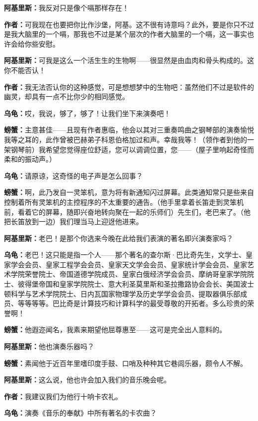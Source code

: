 \documentclass[
  12pt,
  twoside,
  openright,
  oldfontcommands,
]{memoir}
\newcommand{\kaitismall}[1]{{\kaitifamily\small #1}}
\newcommand{\dialogname}[1]{{\sffamily\bfseries #1}}
\begin{document}
\dialogname{阿基里斯：}我反对只是像个嗝那样存在！

\dialogname{作者：}可我现在也要把你比作沙堡，阿基。这不很有诗意吗？此外，要是你只不过是我大脑里的一个嗝，那我也不过是某个层次的作者大脑里的一个嗝，这一事实也许会给你些安慰。

\dialogname{阿基里斯：}可我是这么一个活生生的生物啊------很显然是由血肉和骨头构成的。这你不能否认！

\dialogname{作者：}我无法否认你的这种感觉，可是想想梦中的生物吧：虽然他们不过是软件的幽灵，却具有一点不比你少的相同感觉。

\dialogname{乌龟：}哎，我说，够了，够了！让我们坐下来演奏吧！

\dialogname{螃蟹：}主意甚佳------且现有作者惠临，他会以其对三重奏鸣曲之钢琴部的演奏愉悦我等之耳的，此作曾被巴赫弟子科恩伯格加过和声。幸哉我等！\kaitismall{（领作者到他的一架钢琴前）}我希望您觉得座位舒适，您可以调调位置，您------\kaitismall{（屋子里响起奇怪而柔和的振动声。）}

\dialogname{乌龟：}请原谅，这奇怪的电子声是怎么回事？

\dialogname{螃蟹：}啊，此乃发自一灵笨机，意为将有新通知闪过屏幕。此类通知常只是些来自控制着所有灵笨机的主控程序的不太重要的通告。\kaitismall{（他手里拿着长笛走到灵笨机前，看着它的屏幕，随即兴奋地转向聚在一起的乐师们）}先生们，老巴来了。\kaitismall{（他把长笛放到一边）}我们理当马上迎迓他进来。

\dialogname{阿基里斯：}老巴！是那个你选来今晚在此给我们表演的著名即兴演奏家吗？

\dialogname{乌龟：}老巴！这只能是指一个人------那个著名的查尔斯·巴比奇先生，文学士、皇家学会会员、皇家工程学会会员、皇家天文学会会员、皇家统计学会会员、皇家艺术学院荣誉院士、帝国道德学院成员、皇家白俄经济学会会员、摩纳哥皇家学院院士、彼得堡帝国和皇家学院院士、意大利圣莫里斯和圣拉撒路协会会长、美国波士顿科学与艺术学院院士、日内瓦国家物理学及历史学学会会员、提取器俱乐部成员、等等等等。巴比奇是计算技巧和计算科学的最受尊敬的开拓者。多么珍贵的荣誉啊！

\dialogname{螃蟹：}他遐迩闻名，我素来期望他屈尊惠至------这可是完全出人意料的。

\dialogname{阿基里斯：}他也演奏乐器吗？

\dialogname{螃蟹：}素闻他于近百年里嗜印度手鼓、口哨及种种其它巷闾乐器，颇令人不解。

\dialogname{阿基里斯：}这么说，他也许会加入我们的音乐晚会呢。

\dialogname{作者：}我建议我们为他行十响卡农礼。

\dialogname{乌龟：}演奏《音乐的奉献》中所有著名的卡农曲？
\end{document}
